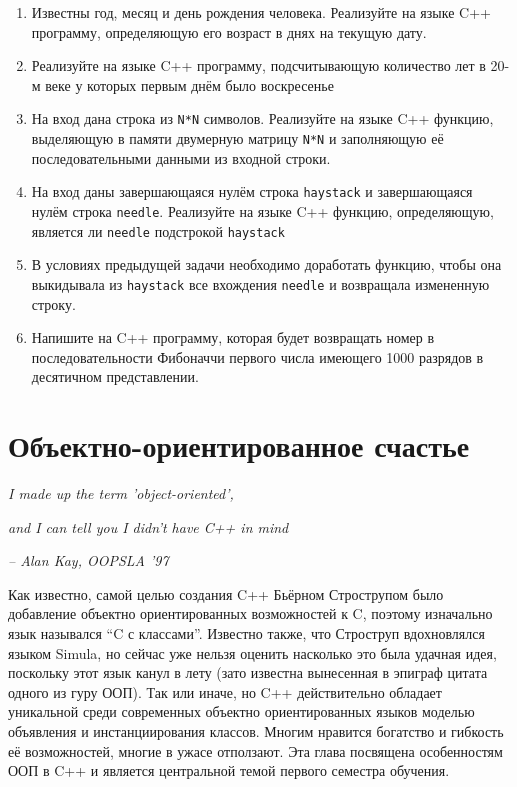 \documentclass[a4paper,12pt,oneside]{book}
\begin{document}
\begin{enumerate}
\item
Известны год, месяц и день рождения человека. Реализуйте на языке C++ программу, определяющую его возраст в днях на текущую дату.

\item
Реализуйте на языке C++ программу, подсчитывающую количество лет в 20-м веке у которых первым днём было воскресенье

\item
На вход дана строка из \lstinline!N*N! символов. Реализуйте на языке C++ функцию, выделяющую в памяти двумерную матрицу \lstinline!N*N! и заполняющую её последовательными данными из входной строки.

\item
На вход даны завершающаяся нулём строка \lstinline!haystack! и завершающаяся нулём строка \lstinline!needle!. Реализуйте на языке C++ функцию, определяющую, является ли \lstinline!needle! подстрокой \lstinline!haystack!

\item
В условиях предыдущей задачи необходимо доработать функцию, чтобы она выкидывала из \lstinline!haystack! все вхождения \lstinline!needle! и возвращала измененную строку.

\item
Напишите на C++ программу, которая будет возвращать номер в последовательности Фибоначчи первого числа имеющего 1000 разрядов в десятичном представлении.

\end{enumerate}

\pagebreak
\chapter{Объектно-ориентированное счастье}\label{chap:OOP}

\hfill\textit{I made up the term 'object-oriented',}

\hfill\textit{and I can tell you I didn't have C++ in mind} {\vspace{0.5em}}

\hfill\textit{-- Alan Kay, OOPSLA '97}

Как известно, самой целью создания C++ Бьёрном Строструпом было добавление объектно ориентированных возможностей к C, поэтому изначально язык назывался ``C с классами''. Известно также, что Строструп вдохновлялся языком Simula, но сейчас уже нельзя оценить насколько это была удачная идея, поскольку этот язык канул в лету (зато известна вынесенная в эпиграф цитата одного из гуру ООП). Так или иначе, но C++ действительно обладает уникальной среди современных объектно ориентированных языков моделью объявления и инстанциирования классов. Многим нравится богатство и гибкость её возможностей, многие в ужасе отползают. Эта глава посвящена особенностям ООП в C++ и является центральной темой первого семестра обучения.
\end{document}

